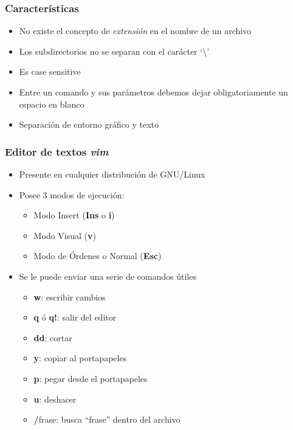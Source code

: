 \begin{frame}
  \frametitle{Características}
  \begin{itemize}
	  \item No existe el concepto de \emph{extensión} en el nombre de un archivo
	  \item Los subdirectorios no se separan con el carácter `\textbackslash'
	  \item Es case sensitive
	  \item Entre un comando y sus parámetros debemos dejar obligatoriamente un espacio en blanco
	  \item Separación de entorno gráfico y texto
  \end{itemize}
\end{frame}

\begin{frame}
  \frametitle{Editor de textos \textbf{\emph{vim}}}
  \begin{itemize}
	  \item Presente en cualquier distribución de GNU/Linux
	  \item Posee 3 modos de ejecución:
	  \begin{itemize}
	  	\item Modo Insert (\textbf{Ins} o \textbf{i})
	  	\item Modo Visual (\textbf{v})
	  	\item Modo de Órdenes o Normal (\textbf{Esc})
	  \end{itemize}
	  \item Se le puede enviar una serie de comandos útiles
	  \begin{itemize}
	  	\item \textbf{w}: escribir cambios
	  	\item \textbf{q} ó \textbf{q!}: salir del editor
	  	\item \textbf{dd}: cortar
	  	\item \textbf{y}: copiar al portapapeles
	  	\item \textbf{p}: pegar desde el portapapeles
	  	\item \textbf{u}: deshacer
	  	\item \textbf{/}frase: busca ``frase'' dentro del archivo
	  \end{itemize}
  \end{itemize}
\end{frame}

